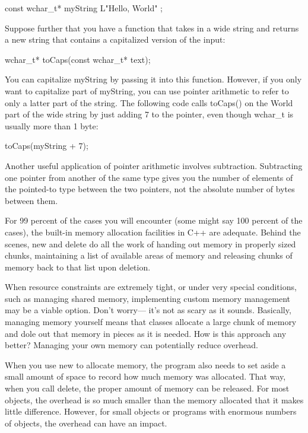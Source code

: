 \begin{cpp}
const wchar_t* myString { L"Hello, World" };
\end{cpp}

Suppose further that you have a function that takes in a wide string and returns a new string that contains a capitalized version of the input:

\begin{cpp}
wchar_t* toCaps(const wchar_t* text);
\end{cpp}

You can capitalize myString by passing it into this function. However, if you only want to capitalize part of myString, you can use pointer arithmetic to refer to only a latter part of the string. The following code calls toCaps() on the World part of the wide string by just adding 7 to the pointer, even though wchar\_t is usually more than 1 byte:

\begin{cpp}
toCaps(myString + 7);
\end{cpp}

Another useful application of pointer arithmetic involves subtraction. Subtracting one pointer from another of the same type gives you the number of elements of the pointed-to type between the two pointers, not the absolute number of bytes between them.


For 99 percent of the cases you will encounter (some might say 100 percent of the cases), the built-in memory allocation facilities in C++ are adequate. Behind the scenes, new and delete do all the work of handing out memory in properly sized chunks, maintaining a list of available areas of memory and releasing chunks of memory back to that list upon deletion.

When resource constraints are extremely tight, or under very special conditions, such as managing shared memory, implementing custom memory management may be a viable option. Don’t worry— it’s not as scary as it sounds. Basically, managing memory yourself means that classes allocate a large chunk of memory and dole out that memory in pieces as it is needed. How is this approach any better? Managing your own memory can potentially reduce overhead.

When you use new to allocate memory, the program also needs to set aside a small amount of space to record how much memory was allocated. That way, when you call delete, the proper amount of memory can be released. For most objects, the overhead is so much smaller than the memory allocated that it makes little difference. However, for small objects or programs with enormous numbers of objects, the overhead can have an impact.

